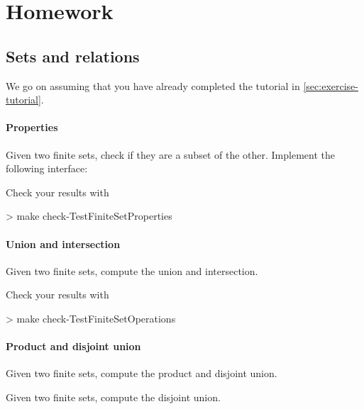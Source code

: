 \part{Homework}


\chapter{Sets and relations}

We go on assuming that you have already completed the tutorial in \cref{sec:exercise-tutorial}.

\subsection{Properties}

\begin{gradedexercise}
  Given two finite sets, check if they are a subset of the other.
  Implement the following interface:
\end{gradedexercise}

Check your results with
\begin{console}
  > make check-TestFiniteSetProperties
\end{console}

\subsection{Union and intersection}


\begin{gradedexercise}
  Given two finite sets, compute the union and intersection.
\end{gradedexercise}


Check your results with
\begin{console}
  > make check-TestFiniteSetOperations
\end{console}

\subsection{Product and disjoint union}

\begin{gradedexercise}
  Given two finite sets, compute the product and disjoint union.

\end{gradedexercise}
\begin{gradedexercise}
  Given two finite sets, compute the disjoint union.

\end{gradedexercise}



